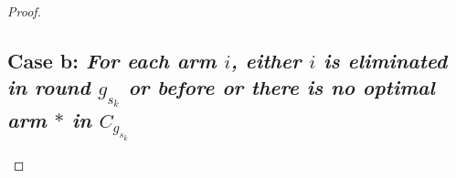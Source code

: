 \begin{proof}
%	
%	 
%	 


\subsection*{Case b: \textit{For each arm $i$, either ${i}$ is eliminated in round $g_{s_{k}}$ or before or there is no optimal arm ${*}$ in $C_{g_{s_{k}}}$ }}


\end{proof}
